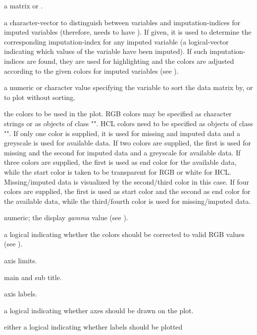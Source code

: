 \begin{Arguments}
\begin{ldescription}
\item[\code{x}] a matrix or .
\item[\code{delimiter}] a character-vector to distinguish between variables
and imputation-indices for imputed variables (therefore,  needs
to have ). If given, it is used to determine the
corresponding imputation-index for any imputed variable (a logical-vector
indicating which values of the variable have been imputed). If such
imputation-indices are found, they are used for highlighting and the
colors are adjusted	according to the given colors for imputed variables
(see ).
\item[\code{sortby}] a numeric or character value specifying the variable to sort 
the data matrix by, or  to plot without sorting.
\item[\code{col}] the colors to be used in the plot.  RGB colors may be specified as 
character strings or as objects of class 
"".  HCL colors need to be specified as 
objects of class "".  If only 
one color is supplied, it is used for missing and imputed data and a greyscale is used 
for available data. If two colors are supplied, the first is used for missing and
the second for imputed data and a greyscale for available data.
If three colors are supplied, the first is used as end 
color for the available data, while the start color is taken to be 
transparent for RGB or white for HCL.  Missing/imputed data is visualized by the 
second/third color in this case.  If four colors are supplied, the first is used 
as start color and the second as end color for the available data, while 
the third/fourth color is used for missing/imputed data.
\item[\code{gamma}] numeric; the display \emph{gamma} value (see 
).
\item[\code{fixup}] a logical indicating whether the colors should be corrected to 
valid RGB values (see ).
\item[\code{xlim, ylim}] axis limits.
\item[\code{main, sub}] main and sub title.
\item[\code{xlab, ylab}] axis labels.
\item[\code{axes}] a logical indicating whether axes should be drawn on the plot.
\item[\code{labels}] either a logical indicating whether labels should be plotted 

\end{ldescription}
\end{Arguments}
